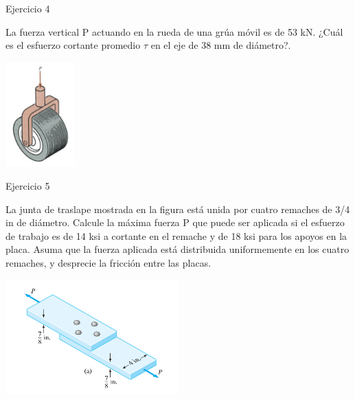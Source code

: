\documentclass[12pt,letterpaper]{article}
\begin{document}
\begin{ejemplo}{Ejercicio 4}

La fuerza vertical P actuando en la rueda de una grúa móvil es de 53 kN. ¿Cuál es el esfuerzo cortante 
promedio $\tau$ en el eje de 38 mm de diámetro?.

\begin{center}
\includegraphics[width=0.2\textwidth]{img/p04.PNG}
\end{center}

\end{ejemplo}


\begin{ejemplo}{Ejercicio 5}

La junta de traslape mostrada en la figura está unida por cuatro remaches de 3/4 in de diámetro. Calcule 
la máxima fuerza P que puede ser aplicada si el esfuerzo de trabajo es de 14 ksi a cortante en el remache 
y de 18 ksi para los apoyos en la placa. Asuma que la fuerza aplicada está distribuida uniformemente en 
los cuatro remaches, y desprecie la fricción entre las placas.

\begin{center}
\includegraphics[width=0.5\textwidth]{img/p05.PNG}
\end{center}

\end{ejemplo}
\end{document}
